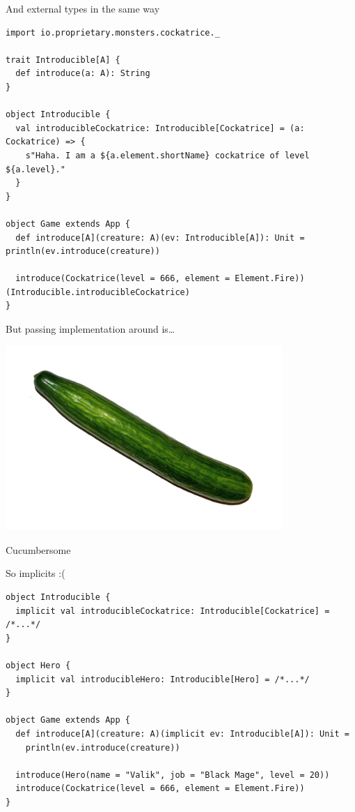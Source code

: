 \documentclass[presentation,aspectratio=169,smaller]{beamer}
\begin{document}
\begin{frame}[label={sec:orgd97e212},fragile]{And external types in the same way}
 \begin{verbatim}
import io.proprietary.monsters.cockatrice._

trait Introducible[A] {
  def introduce(a: A): String
}

object Introducible {
  val introducibleCockatrice: Introducible[Cockatrice] = (a: Cockatrice) => {
    s"Haha. I am a ${a.element.shortName} cockatrice of level ${a.level}."
  }
}

object Game extends App {
  def introduce[A](creature: A)(ev: Introducible[A]): Unit = println(ev.introduce(creature))

  introduce(Cockatrice(level = 666, element = Element.Fire))(Introducible.introducibleCockatrice)
}
\end{verbatim}
\end{frame}

\begin{frame}[label={sec:orga6e003e}]{But passing implementation around is\ldots{}}
\begin{center}
\includegraphics[height=7cm]{images/cucumber.jpg}
\end{center}

Cucumbersome
\end{frame}

\begin{frame}[label={sec:orgc890088},fragile]{So implicits :(}
 \begin{verbatim}
object Introducible {
  implicit val introducibleCockatrice: Introducible[Cockatrice] = /*...*/
}

object Hero {
  implicit val introducibleHero: Introducible[Hero] = /*...*/
}

object Game extends App {
  def introduce[A](creature: A)(implicit ev: Introducible[A]): Unit =
    println(ev.introduce(creature))

  introduce(Hero(name = "Valik", job = "Black Mage", level = 20))
  introduce(Cockatrice(level = 666, element = Element.Fire))
}
\end{verbatim}
\end{frame}
\end{document}
